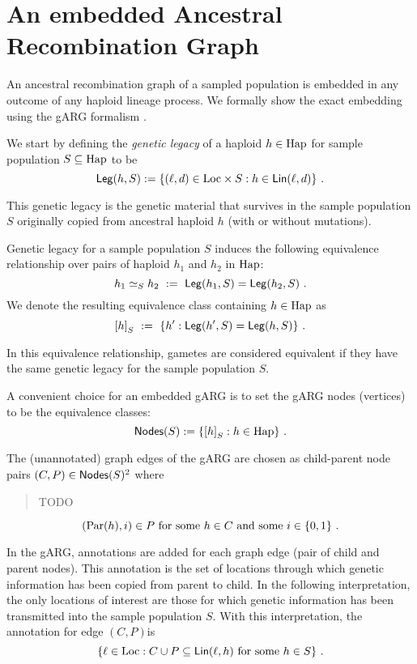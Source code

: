 \documentclass{article}
\begin{document}
\section{An embedded Ancestral Recombination Graph}

An ancestral recombination graph \cite{friedman_ancestral_1997}
\cite{hein_gene_2005} \cite{wakeley_coalescent_2009} of a sampled
population is embedded in any outcome of any haploid lineage process.
We formally show the
exact embedding using the gARG formalism \cite{wong_what_arg_2022}.

We start by defining the \emph{genetic legacy} of a haploid
$h \in \mathrm{Hap}$ for sample population $S \subseteq \mathrm{Hap}$ to be
$$
  \mathsf{Leg}(h, S) := \{ (\ell, d) \in \mathrm{Loc} \times S : h \in \mathsf{Lin}(\ell, d) \}
\text{ .}
$$

This genetic legacy is the genetic material that survives in the
sample population $S$ originally copied from ancestral haploid $h$
(with or without mutations).

Genetic legacy for a sample population $S$ induces the following
equivalence relationship over pairs of haploid $h_1$ and $h_2$ in
$\mathrm{Hap}$:
$$
h_1 \simeq_S h_2 \ := \ \mathsf{Leg}(h_1, S) = \mathsf{Leg}(h_2, S)
\text{ .}
$$
We denote the resulting equivalence class containing $h \in \mathrm{Hap}$ as
$$
{[h]}_S \ := \ \{ h' : \mathsf{Leg}(h', S) = \mathsf{Leg}(h, S) \}
\text{ .}
$$

In this equivalence relationship, gametes are considered equivalent if
they have the same genetic legacy for the sample population $S$.

A convenient choice for an embedded gARG \cite{wong_what_arg_2022} is
to set the gARG nodes (vertices) to be the equivalence classes:
$$
   \mathsf{Nodes}(S) := \{ {[h]}_S : h \in \mathrm{Hap} \}
\text{ .}
$$

The (unannotated) graph edges of the gARG are chosen as child-parent
node pairs $(C, P) \in \mathsf{Nodes}(S)^2$ where

\begin{quote}
TODO
\end{quote}

$$
  (\mathrm{Par}(h), i) \in P \text{ for some $h \in C$ and some $i \in \{0, 1\}$ .}
$$

In the gARG, annotations are added for each graph edge (pair of child
and parent nodes). This annotation is the set of locations through which
genetic information has been copied from parent to child. In the
following interpretation, the only locations of interest are those for
which genetic information has been transmitted into the sample
population $S$. With this interpretation, the annotation for edge
$(C,P)$is
$$
  \{ \ell \in \mathrm{Loc} :
     C \cup P \subseteq \mathsf{Lin}(\ell, h) \text{ for some $h \in S$}
  \}
\text{ .}
$$
\end{document}
